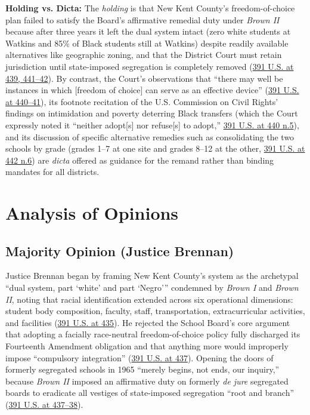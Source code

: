 \documentclass[12pt]{article}
\begin{document}
\textbf{Holding vs. Dicta:} The \textit{holding} is that New Kent County's freedom-of-choice plan failed to satisfy the Board's affirmative remedial duty under \textit{Brown II} because after three years it left the dual system intact (zero white students at Watkins and 85\% of Black students still at Watkins) despite readily available alternatives like geographic zoning, and that the District Court must retain jurisdiction until state-imposed segregation is completely removed (\href{https://supreme.justia.com/cases/federal/us/391/430/}{391 U.S. at 439, 441--42}). By contrast, the Court's observations that ``there may well be instances in which [freedom of choice] can serve as an effective device'' (\href{https://supreme.justia.com/cases/federal/us/391/430/}{391 U.S. at 440--41}), its footnote recitation of the U.S. Commission on Civil Rights' findings on intimidation and poverty deterring Black transfers (which the Court expressly noted it ``neither adopt[s] nor refuse[s] to adopt,'' \href{https://supreme.justia.com/cases/federal/us/391/430/}{391 U.S. at 440 n.5}), and its discussion of specific alternative remedies such as consolidating the two schools by grade (grades 1--7 at one site and grades 8--12 at the other, \href{https://supreme.justia.com/cases/federal/us/391/430/}{391 U.S. at 442 n.6}) are \textit{dicta} offered as guidance for the remand rather than binding mandates for all districts.

\section{Analysis of Opinions}

\subsection{Majority Opinion (Justice Brennan)}

Justice Brennan began by framing New Kent County's system as the archetypal ``dual system, part `white' and part `Negro''' condemned by \textit{Brown I} and \textit{Brown II}, noting that racial identification extended across six operational dimensions: student body composition, faculty, staff, transportation, extracurricular activities, and facilities (\href{https://supreme.justia.com/cases/federal/us/391/430/}{391 U.S. at 435}). He rejected the School Board's core argument that adopting a facially race-neutral freedom-of-choice policy fully discharged its Fourteenth Amendment obligation and that anything more would improperly impose ``compulsory integration'' (\href{https://supreme.justia.com/cases/federal/us/391/430/}{391 U.S. at 437}). Opening the doors of formerly segregated schools in 1965 ``merely begins, not ends, our inquiry,'' because \textit{Brown II} imposed an affirmative duty on formerly \textit{de jure} segregated boards to eradicate all vestiges of state-imposed segregation ``root and branch'' (\href{https://supreme.justia.com/cases/federal/us/391/430/}{391 U.S. at 437--38}).
\end{document}
